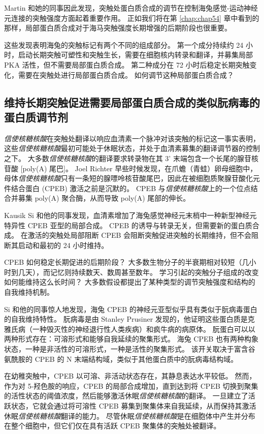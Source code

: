 Martin 和她的同事因此发现，突触处蛋白质合成的调节在控制海兔感觉-运动神经元连接的突触强度方面起着重要作用。
正如我们将在第 \ref{chap:chap54} 章中看到的那样，局部蛋白质合成对于海马突触强度长期增强的后期阶段也很重要。


这些发现表明海兔的突触标记有两个不同的组成部分。
第一个成分持续约 24 小时，启动长期突触可塑性和突触生长，需要在细胞核内转录和翻译，并募集局部 PKA 活性，但不需要局部蛋白质合成。
第二种成分在 72 小时后稳定长期突触变化，需要在突触处进行局部蛋白质合成。
如何调节这种局部蛋白质合成？



\subsection{维持长期突触促进需要局部蛋白质合成的类似朊病毒的蛋白质调节剂}

\textit{信使核糖核酸}在突触处翻译以响应血清素一个脉冲对该突触的标记这一事实表明，这些\textit{信使核糖核酸}最初可能处于休眠状态，并处于血清素募集的翻译调节器的控制之下。
大多数\textit{信使核糖核酸}的翻译要求转录物在其 3' 末端包含一个长尾的腺苷核苷酸 [poly(A) 尾巴]。
Joel Richter 早些时候发现，在爪蟾（青蛙）卵母细胞中，母体\textit{信使核糖核酸}只有一条短的腺嘌呤核苷酸尾巴，因此在被细胞质聚腺苷酸化元件结合蛋白 (CPEB) 激活之前是沉默的。
CPEB 与\textit{信使核糖核酸}上的一个位点结合并募集 poly(A) 聚合酶，从而导致 poly(A) 尾部的伸长。


Kausik Si 和他的同事发现，血清素增加了海兔感觉神经元末梢中一种新型神经元特异性 CPEB 亚型的局部合成。
CPEB 的诱导与转录无关，但需要新的蛋白质合成。
在激活的突触处局部阻断 CPEB 会阻断突触促进突触的长期维持，但不会阻断其启动和最初的 24 小时维持。


CPEB 如何稳定长期促进的后期阶段？
大多数生物分子的半衰期相对较短（几小时到几天），而记忆则持续数天、数周甚至数年。
学习引起的突触分子组成的改变如何能维持这么长时间？
大多数假设都提出了某种类型的调节突触强度和结构的自我维持机制。


Si 和他的同事惊人地发现，海兔 CPEB 的神经元亚型似乎具有类似于朊病毒蛋白的自我维持特性。
朊病毒是由 Stanley Prusiner 发现的，他证明这些蛋白质是克雅氏病（一种毁灭性的神经退行性人类疾病）和疯牛病的病原体。
朊蛋白可以以两种形式存在：可溶形式和能够自我延续的聚集形式。
海兔 CPEB 也有两种构象状态，一种是非活性的可溶形式，一种是活性的聚集形式。
该开关取决于富含谷氨酰胺的 CPEB 的 N 末端结构域，类似于其他蛋白质中的朊病毒结构域。


在幼稚突触中，CPEB 以可溶、非活动状态存在，其静息表达水平较低。
然而，作为对 5-羟色胺的响应，CPEB 的局部合成增加，直到达到将 CPEB 切换到聚集的活性状态的阈值浓度，然后能够激活休眠\textit{信使核糖核酸}的翻译。
一旦建立了活跃状态，它就会通过将可溶性 CPEB 募集到聚集体来自我延续，从而保持其激活休眠\textit{信使核糖核酸}翻译的能力。
尽管休眠\textit{信使核糖核酸}是在细胞体中产生并分布在整个细胞中，但它们仅在具有活跃 CPEB 聚集体的突触处被翻译。


